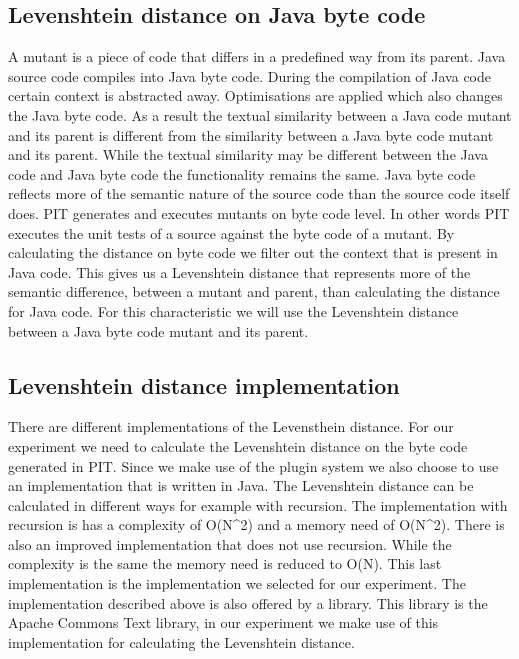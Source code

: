 \documentclass[../../main]{subfiles}
\begin{document}
\subsection{Levenshtein distance on Java byte code}
A mutant is a piece of code that differs in a predefined way from its parent.
Java source code compiles into Java byte code.
During the compilation of Java code certain context is abstracted away\cite{byteCodeEngineering}.
Optimisations are applied which also changes the Java byte code\cite{byteCodeEngineering}.
As a result the textual similarity between a Java code mutant and its parent is different from the similarity between a Java byte code mutant and its parent.
While the textual similarity may be different between the Java code and Java byte code the functionality remains the same.
Java byte code reflects more of the semantic nature of the source code than the source code itself does. 
PIT generates and executes mutants on byte code level\cite{pitestBytecode}. 
In other words PIT executes the unit tests of a source against the byte code of a mutant.
\newline
By calculating the distance on byte code we filter out the context that is present in Java code.
This gives us a Levenshtein distance that represents more of the semantic difference, between a mutant and parent, than calculating the distance for Java code.
For this characteristic we will use the Levenshtein distance between a Java byte code mutant and its parent.

\subsection{Levenshtein distance implementation}
There are different implementations of the Levensthein distance.
For our experiment we need to calculate the Levenshtein distance on the byte code generated in PIT.
Since we make use of the plugin system we also choose to use an implementation that is written in Java.
The Levenshtein distance can be calculated in different ways for example with recursion.
The implementation with recursion is has a complexity of O(N\^{}2) and a memory need of O(N\^{}2).
There is also an improved implementation that does not use recursion.
While the complexity is the same the memory need is reduced to O(N).
This last implementation is the implementation we selected for our experiment.
The implementation described above is also offered by a library.
This library is the Apache Commons Text library\cite{commonsText}, in our experiment we make use of this implementation for calculating the Levenshtein distance.
\end{document}
